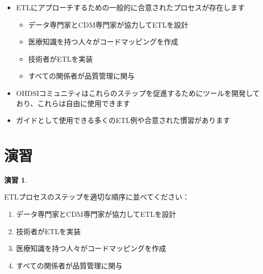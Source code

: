 \documentclass[
  11pt]{book}
\makeatletter
\providecommand{\tightlist}{%
  \setlength{\itemsep}{0pt}\setlength{\parskip}{0pt}}
\newenvironment{kframe}{%
\medskip{}
\setlength{\fboxsep}{.8em}
 \def\at@end@of@kframe{}%
 \ifinner\ifhmode%
  \def\at@end@of@kframe{\end{minipage}}%
  \begin{minipage}{\columnwidth}%
 \fi\fi%
 \def\FrameCommand##1{\hskip\@totalleftmargin \hskip-\fboxsep
 \colorbox{myShadeColor}{##1}\hskip-\fboxsep
     \hskip-\linewidth \hskip-\@totalleftmargin \hskip\columnwidth}%
 \MakeFramed {\advance\hsize-\width
   \@totalleftmargin\z@ \linewidth\hsize
   \@setminipage}}%
 {\par\unskip\endMakeFramed%
 \at@end@of@kframe}
\newenvironment{rmdblock}[1]
  {
  \begin{itemize}
  \renewcommand{\labelitemi}{
    \raisebox{-.7\height}[0pt][0pt]{
      {\setkeys{Gin}{width=3em,keepaspectratio}\texttt{[image: images/\#1]}}
    }
  }
  \setlength{\fboxsep}{1em}
  \begin{kframe}
  \item
  }
  {
  \end{kframe}
  \end{itemize}
  }
\newenvironment{rmdsummary}
  {\begin{rmdblock}{summary}}
  {\end{rmdblock}}
\theoremstyle{definition}
\theoremstyle{definition}
\theoremstyle{definition}
\newtheorem{exercise}{演習}[chapter]
\theoremstyle{definition}
\theoremstyle{remark}
\makeatother
\begin{document}
\begin{rmdsummary}
\begin{itemize}
\item
  ETLにアプローチするための一般的に合意されたプロセスが存在します

  \begin{itemize}
  \tightlist
  \item
    データ専門家とCDM専門家が協力してETLを設計
  \item
    医療知識を持つ人々がコードマッピングを作成
  \item
    技術者がETLを実装
  \item
    すべての関係者が品質管理に関与
  \end{itemize}
\item
  OHDSIコミュニティはこれらのステップを促進するためにツールを開発しており、これらは自由に使用できます
\item
  ガイドとして使用できる多くのETL例や合意された慣習があります
\end{itemize}
\end{rmdsummary}

\section{演習}\label{ux6f14ux7fd2-1}

\begin{exercise}
\protect\hypertarget{exr:exerciseEtl1}{}\label{exr:exerciseEtl1}

ETLプロセスのステップを適切な順序に並べてください：

\begin{enumerate}
\def\labelenumi{\Alph{enumi})}
\tightlist
\item
  データ専門家とCDM専門家が協力してETLを設計
\item
  技術者がETLを実装
\item
  医療知識を持つ人々がコードマッピングを作成
\item
  すべての関係者が品質管理に関与
\end{enumerate}

\end{exercise}
\end{document}
